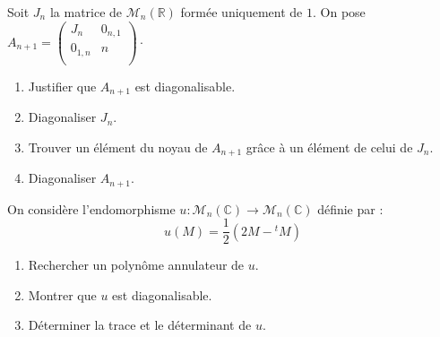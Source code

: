 \documentclass[french,11pt,twoside]{VcCours}
\begin{document}


\begin{Exercice}
  Soit $J_n$ la matrice de $\mathcal{M}_n(\mathbb{R})$ formée uniquement de $1$. On pose $A_{n+1} = \begin{pmatrix}
    J_n & 0_{n,1} \\
    0_{1,n} & n \\
    \end{pmatrix}\cdot$
    
    \begin{enumerate}
    \item Justifier que $A_{n+1}$ est diagonalisable.
    \item Diagonaliser $J_n$.
    \item Trouver un élément du noyau de $A_{n+1}$ grâce à un élément de celui de $J_n$.
    \item Diagonaliser $A_{n+1}$.
    \end{enumerate}
    
\end{Exercice}


\begin{Exercice}
  On considère l'endomorphisme $u : \mathcal{M}_n(\mathbb{C}) \rightarrow \mathcal{M}_n(\mathbb{C})$ définie par :
  $$ u(M) = \dfrac{1}{2} (2M- {}^t M)$$
  \begin{enumerate}
  \item Rechercher un polynôme annulateur de $u$.
  \item Montrer que $u$ est diagonalisable.
  \item Déterminer la trace et le déterminant de $u$.
  \end{enumerate}
\end{Exercice}
\end{document}
